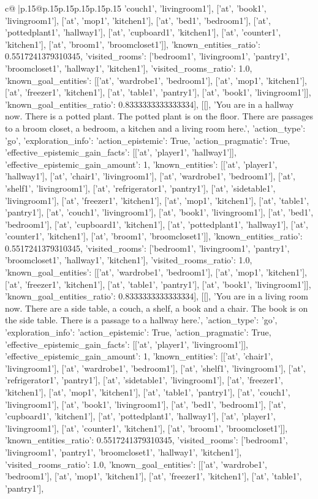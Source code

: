 \documentclass{article}
\begin{document}
{\begin{supertabular}{c@{$\;$}|p{.15\linewidth}@{}p{.15\linewidth}p{.15\linewidth}p{.15\linewidth}p{.15\linewidth}p{.15\linewidth}}
{{{'couch1', 'livingroom1'], ['at', 'book1', 'livingroom1'], ['at', 'mop1', 'kitchen1'], ['at', 'bed1', 'bedroom1'], ['at', 'pottedplant1', 'hallway1'], ['at', 'cupboard1', 'kitchen1'], ['at', 'counter1', 'kitchen1'], ['at', 'broom1', 'broomcloset1']], 'known_entities_ratio': 0.5517241379310345, 'visited_rooms': ['bedroom1', 'livingroom1', 'pantry1', 'broomcloset1', 'hallway1', 'kitchen1'], 'visited_rooms_ratio': 1.0, 'known_goal_entities': [['at', 'wardrobe1', 'bedroom1'], ['at', 'mop1', 'kitchen1'], ['at', 'freezer1', 'kitchen1'], ['at', 'table1', 'pantry1'], ['at', 'book1', 'livingroom1']], 'known_goal_entities_ratio': 0.8333333333333334}}], [[], 'You are in a hallway now. There is a potted plant. The potted plant is on the floor. There are passages to a broom closet, a bedroom, a kitchen and a living room here.', {'action_type': 'go', 'exploration_info': {'action_epistemic': True, 'action_pragmatic': True, 'effective_epistemic_gain_facts': [['at', 'player1', 'hallway1']], 'effective_epistemic_gain_amount': 1, 'known_entities': [['at', 'player1', 'hallway1'], ['at', 'chair1', 'livingroom1'], ['at', 'wardrobe1', 'bedroom1'], ['at', 'shelf1', 'livingroom1'], ['at', 'refrigerator1', 'pantry1'], ['at', 'sidetable1', 'livingroom1'], ['at', 'freezer1', 'kitchen1'], ['at', 'mop1', 'kitchen1'], ['at', 'table1', 'pantry1'], ['at', 'couch1', 'livingroom1'], ['at', 'book1', 'livingroom1'], ['at', 'bed1', 'bedroom1'], ['at', 'cupboard1', 'kitchen1'], ['at', 'pottedplant1', 'hallway1'], ['at', 'counter1', 'kitchen1'], ['at', 'broom1', 'broomcloset1']], 'known_entities_ratio': 0.5517241379310345, 'visited_rooms': ['bedroom1', 'livingroom1', 'pantry1', 'broomcloset1', 'hallway1', 'kitchen1'], 'visited_rooms_ratio': 1.0, 'known_goal_entities': [['at', 'wardrobe1', 'bedroom1'], ['at', 'mop1', 'kitchen1'], ['at', 'freezer1', 'kitchen1'], ['at', 'table1', 'pantry1'], ['at', 'book1', 'livingroom1']], 'known_goal_entities_ratio': 0.8333333333333334}}], [[], 'You are in a living room now. There are a side table, a couch, a shelf, a book and a chair. The book is on the side table. There is a passage to a hallway here.', {'action_type': 'go', 'exploration_info': {'action_epistemic': True, 'action_pragmatic': True, 'effective_epistemic_gain_facts': [['at', 'player1', 'livingroom1']], 'effective_epistemic_gain_amount': 1, 'known_entities': [['at', 'chair1', 'livingroom1'], ['at', 'wardrobe1', 'bedroom1'], ['at', 'shelf1', 'livingroom1'], ['at', 'refrigerator1', 'pantry1'], ['at', 'sidetable1', 'livingroom1'], ['at', 'freezer1', 'kitchen1'], ['at', 'mop1', 'kitchen1'], ['at', 'table1', 'pantry1'], ['at', 'couch1', 'livingroom1'], ['at', 'book1', 'livingroom1'], ['at', 'bed1', 'bedroom1'], ['at', 'cupboard1', 'kitchen1'], ['at', 'pottedplant1', 'hallway1'], ['at', 'player1', 'livingroom1'], ['at', 'counter1', 'kitchen1'], ['at', 'broom1', 'broomcloset1']], 'known_entities_ratio': 0.5517241379310345, 'visited_rooms': ['bedroom1', 'livingroom1', 'pantry1', 'broomcloset1', 'hallway1', 'kitchen1'], 'visited_rooms_ratio': 1.0, 'known_goal_entities': [['at', 'wardrobe1', 'bedroom1'], ['at', 'mop1', 'kitchen1'], ['at', 'freezer1', 'kitchen1'], ['at', 'table1', 'pantry1'], }}}
\end{supertabular}}
\end{document}
